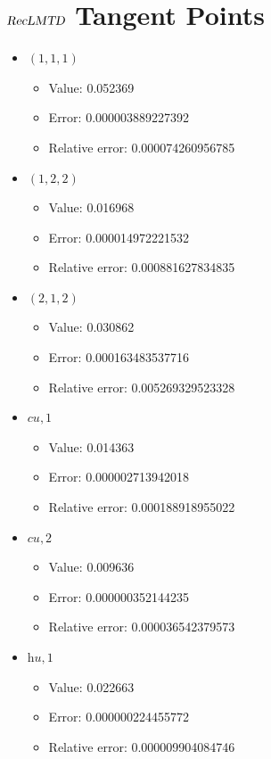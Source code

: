 \documentclass{article}%
\begin{document}
\section{$\textsl{RecLMTD}$ Tangent Points}%
\thispagestyle{plain}%
\begin{itemize}%
	\item $(1, 1, 1)$%
	\begin{itemize}%
		\item Value: 0.052369%
		\item Error: 0.000003889227392%
		\item Relative error: 0.000074260956785%
	\end{itemize}%
	\item $(1, 2, 2)$%
	\begin{itemize}%
		\item Value: 0.016968%
		\item Error: 0.000014972221532%
		\item Relative error: 0.000881627834835%
	\end{itemize}%
	\item $(2, 1, 2)$%
	\begin{itemize}%
		\item Value: 0.030862%
		\item Error: 0.000163483537716%
		\item Relative error: 0.005269329523328%
	\end{itemize}%
	\item $\textit{cu},1$%
	\begin{itemize}%
		\item Value: 0.014363%
		\item Error: 0.000002713942018%
		\item Relative error: 0.000188918955022%
	\end{itemize}%
	\item $\textit{cu},2$%
	\begin{itemize}%
		\item Value: 0.009636%
		\item Error: 0.000000352144235%
		\item Relative error: 0.000036542379573%
	\end{itemize}%
	\item $\textit{hu},1$%
	\begin{itemize}%
		\item Value: 0.022663%
		\item Error: 0.000000224455772%
		\item Relative error: 0.000009904084746%
	\end{itemize}%
\end{itemize}%
\end{document}
